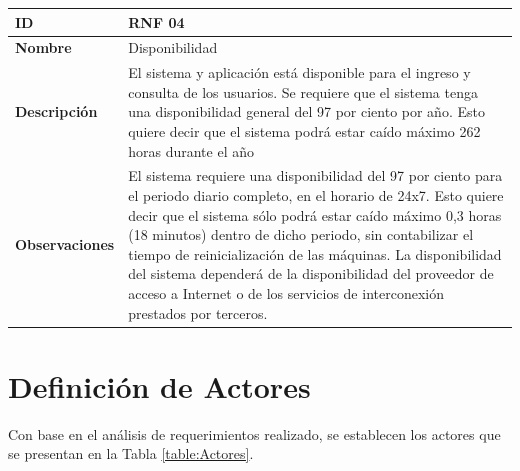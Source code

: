 \begin{center}
\begin{longtable}{p{3cm} p{12cm}}
\textbf{ID} & \textbf{RNF 04} \\ \hline
\textbf{Nombre} & Disponibilidad \\ \hline
\textbf{Descripción} & El sistema y aplicación está disponible para el ingreso y consulta de los usuarios. Se requiere que el sistema tenga una disponibilidad general del 97 por ciento por año. Esto quiere decir que el sistema podrá estar caído máximo 262 horas durante el año \\ \hline
\textbf{Observaciones} & El sistema requiere una disponibilidad del 97 por ciento para el periodo diario completo, en el horario de 24x7.  Esto quiere decir que el sistema sólo podrá estar caído máximo 0,3 horas (18 minutos) dentro de dicho periodo, sin contabilizar el tiempo de reinicialización de las máquinas. La disponibilidad del sistema dependerá de la disponibilidad del proveedor de acceso a Internet o de los servicios de interconexión prestados por terceros. \\ \hline 
\hline

\end{longtable}
\end{center}

\section{Definición de Actores}
Con base en el análisis de requerimientos realizado, se establecen los actores que se presentan en la Tabla \ref{table:Actores}. 

